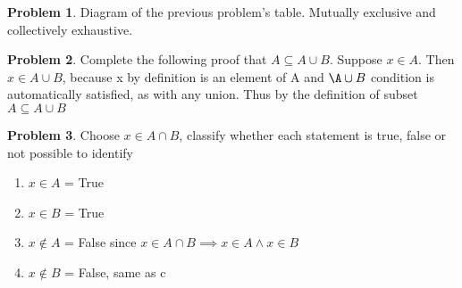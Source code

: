 \documentclass{article}
\theoremstyle{definition}
\newtheorem{problem}{Problem}[section]
\begin{document}
\begin{problem}
    Diagram of the previous problem's table. Mutually exclusive and collectively exhaustive.



\end{problem}


\begin{problem}
    Complete the following proof that $A \subseteq A \cup B$. Suppose $x \in A$. Then $x \in A \cup B$, because x
    by definition is an element of A and $\A \cup B$ condition is automatically satisfied, as with any union.
    Thus by the deﬁnition of subset $A \subseteq A \cup B$
\end{problem}


\begin{problem}
    Choose $x \in A \cap B$, classify whether each statement is true, false or not possible to identify

    \begin{enumerate}[label=(\alph*)]
        \item \(x \in A \) = True
        \item \(x \in B\) = True
        \item \(x \notin A \) = False since $x \in A \cap B \implies x \in A \land x \in B$
        \item \(x \notin B\) = False, same as c
    \end{enumerate}
\end{problem}
\end{document}
